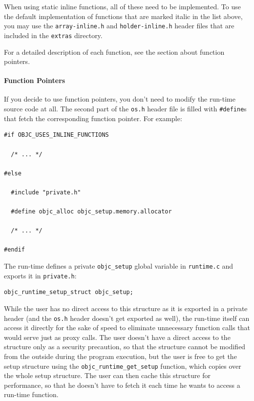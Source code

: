 When using static inline functions, all of these need to be implemented. To use the default implementation of functions that are marked italic in the list above, you may use the \verb=array-inline.h= and \verb=holder-inline.h= header files that are included in the \verb=extras= directory.

For a detailed description of each function, see the section about function pointers.

\paragraph{Function Pointers}

If you decide to use function pointers, you don't need to modify the run-time source code at all. The second part of the \verb=os.h= header file is filled with \verb=#define=s that fetch the corresponding function pointer. For example:

\begin{verbatim}
#if OBJC_USES_INLINE_FUNCTIONS

  /* ... */

#else

  #include "private.h"

  #define objc_alloc objc_setup.memory.allocator

  /* ... */

#endif

\end{verbatim}

The run-time defines a private \verb=objc_setup= global variable in \verb=runtime.c= and exports it in \verb=private.h=:
 
\begin{verbatim}
objc_runtime_setup_struct objc_setup;
\end{verbatim}

While the user has no direct access to this structure as it is exported in a private header (and the \verb=os.h= header doesn't get exported as well), the run-time itself can access it directly for the sake of speed to eliminate unnecessary function calls that would serve just as proxy calls. The user doesn't have a direct access to the structure only as a security precaution, so that the structure cannot be modified from the outside during the program execution, but the user is free to get the setup structure using the \verb=objc_runtime_get_setup= function, which copies over the whole setup structure. The user can then cache this structure for performance, so that he doesn't have to fetch it each time he wants to access a run-time function.

